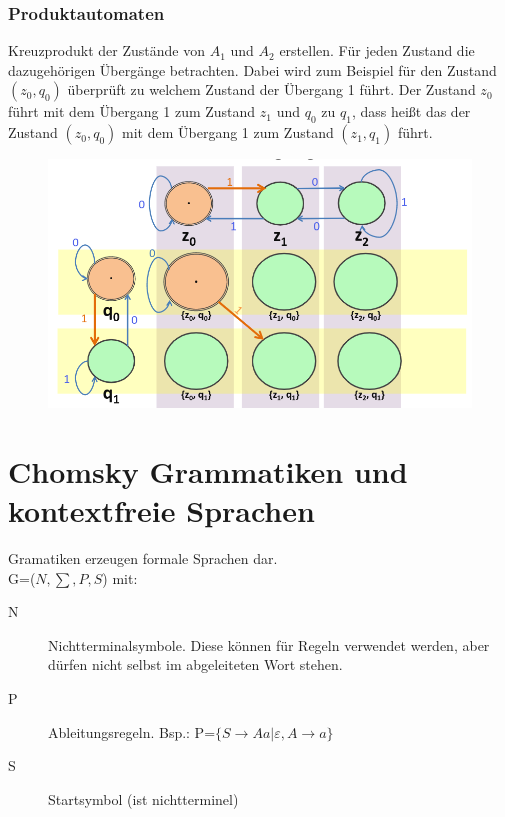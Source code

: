 \documentclass[12pt,a4paper]{article}
\begin{document}
	\subsubsection{Produktautomaten}
	Kreuzprodukt der Zustände von $A_1$ und $A_2$ erstellen. \newline
	Für jeden Zustand die dazugehörigen Übergänge betrachten.\newline
	Dabei wird zum Beispiel für den Zustand $(z_0, q_0)$ überprüft zu welchem Zustand der Übergang 1 führt. Der Zustand $z_0$ führt mit dem Übergang 1 zum Zustand $z_1$ und $q_0$ zu $q_1$, dass heißt das der Zustand $(z_0, q_0)$ mit dem Übergang 1 zum Zustand $(z_1, q_1)$ führt.\newline
	\begin{center}
		\begin{figure}[!h]
			\includegraphics[width=\textwidth]{Bilder/ProduktautomatUbergang.png}
		\end{figure}
	\end{center}


\section{Chomsky Grammatiken und kontextfreie Sprachen}
	Gramatiken erzeugen formale Sprachen dar.\\
	G=($N, \sum , P, S$) mit:\\
	\begin{description}
		\item[N] Nichtterminalsymbole. Diese können für Regeln verwendet werden, aber dürfen nicht selbst im abgeleiteten Wort stehen.
		\item[P] Ableitungsregeln. Bsp.: P=$\{ S \rightarrow Aa | \varepsilon , A \rightarrow a \} $ 
		\item[S] Startsymbol (ist nichtterminel)
	\end{description}
\end{document}
